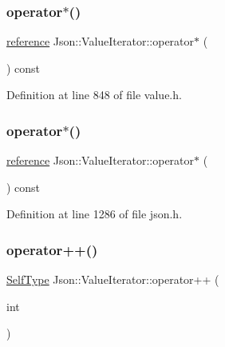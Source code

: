 \subsubsection{\texorpdfstring{operator$\ast$()}{operator*()}\hspace{0.1cm}{\footnotesize\ttfamily [1/2]}}
{\footnotesize\ttfamily \hyperlink{class_json_1_1_value_iterator_ae87929b4567aa00372cf602c43b57160}{reference} Json\+::\+Value\+Iterator\+::operator$\ast$ (\begin{DoxyParamCaption}{ }\end{DoxyParamCaption}) const\hspace{0.3cm}{\ttfamily [inline]}}



Definition at line 848 of file value.\+h.

\hypertarget{class_json_1_1_value_iterator_a3be48b0c1729ec2532f1ff27ad465d32}{}\label{class_json_1_1_value_iterator_a3be48b0c1729ec2532f1ff27ad465d32} 
\subsubsection{\texorpdfstring{operator$\ast$()}{operator*()}\hspace{0.1cm}{\footnotesize\ttfamily [2/2]}}
{\footnotesize\ttfamily \hyperlink{class_json_1_1_value_iterator_ae87929b4567aa00372cf602c43b57160}{reference} Json\+::\+Value\+Iterator\+::operator$\ast$ (\begin{DoxyParamCaption}{ }\end{DoxyParamCaption}) const\hspace{0.3cm}{\ttfamily [inline]}}



Definition at line 1286 of file json.\+h.

\hypertarget{class_json_1_1_value_iterator_abcf4ddd994a010742cd4a436d65acd08}{}\label{class_json_1_1_value_iterator_abcf4ddd994a010742cd4a436d65acd08} 
\subsubsection{\texorpdfstring{operator++()}{operator++()}\hspace{0.1cm}{\footnotesize\ttfamily [1/4]}}
{\footnotesize\ttfamily \hyperlink{class_json_1_1_value_iterator_base_a9d2a940d03ea06d20d972f41a89149ee}{Self\+Type} Json\+::\+Value\+Iterator\+::operator++ (\begin{DoxyParamCaption}\item[{int}]{ }\end{DoxyParamCaption})\hspace{0.3cm}{\ttfamily [inline]}}



